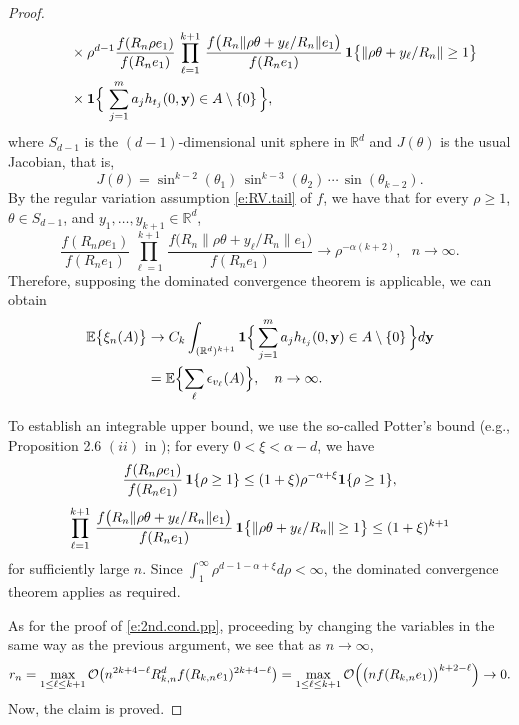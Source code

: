 \documentclass[11pt]{amsart}
\numberwithin{equation}{section}
\theoremstyle{plain}
\theoremstyle{definition}
\begin{document}
\begin{proof}
\begin{align}
&\qquad \times \rho^{d-1} \frac{f(R_n\rho e_1)}{f(R_ne_1)}\, \prod_{\ell = 1}^{k+1}\, \frac{f \bigl( R_n \| \rho \theta + y_\ell /R_n \|e_1 \bigr)}{f(R_ne_1)}\, {{\bf 1}} \bigl\{ \| \rho \theta + y_\ell /R_n \| \geq 1 \bigr\} \notag \\
&\qquad \times {{\bf 1}} \Bigl\{ \ \sum_{j=1}^m a_j h_{t_j}(0, {{\bf y}}) \in A \setminus \{ 0 \}\, \Bigr\}, \notag
\end{align}
where $S_{d-1}$ is the $(d-1)$-dimensional unit sphere in ${{\mathbb R}}^d$ and $J(\theta)$ is the usual Jacobian, that is,
$$
J(\theta)  =   \sin^{k-2}(\theta_1) \, \sin^{k-3}(\theta_2) \, \cdots\, \sin (\theta_{k-2}).
$$
By the regular variation assumption \eqref{e:RV.tail} of $f$, we have that for every $\rho \geq 1$, $\theta \in S_{d-1}$, and $y_1,\dots, y_{k+1} \in {{\mathbb R}}^d$,
$$
\frac{f(R_n\rho e_1)}{f(R_ne_1)}\, \prod_{\ell = 1}^{k+1}\, \frac{f \bigl( R_n \| \rho \theta + y_\ell /R_n \|e_1 \bigr)}{f(R_ne_1)} \to \rho^{-\alpha (k+2)}, \ \ \ n\to\infty.
$$
Therefore, supposing the dominated convergence theorem is applicable, we can obtain
\begin{align*}
{\mathbb{E}} \bigl\{ \xi_n(A) \bigr\} &\to C_k \int_{({{\mathbb R}}^d)^{k+1}} {{\bf 1}} \Bigl\{ \, \sum_{j=1}^m a_j h_{t_j}(0,{{\bf y}}) \in A \setminus \{ 0 \}\, \Bigr\}d{{\bf y}}
\\
&= {\mathbb{E}} \Bigl\{ \sum_\ell \epsilon_{v_\ell} (A) \Bigr\}, \ \ \ n\to\infty.
\end{align*}

To establish an integrable upper bound, we use the so-called Potter's bound (e.g., Proposition 2.6 $(ii)$ in \cite{resnick:2007}); for every $0 < \xi < \alpha-d$, we have 
\begin{equation}  \label{e:P-Potter1}
\frac{f(R_n\rho e_1)}{f(R_ne_1)}\, {{\bf 1}} \{  \rho \geq 1\} \leq (1+\xi) \rho^{-\alpha +\xi}  {{\bf 1}} \{  \rho \geq 1\},
\end{equation}
\begin{equation}  \label{e:P-Potter2}
\prod_{\ell = 1}^{k+1}\, \frac{f \bigl( R_n \| \rho \theta + y_\ell /R_n \|e_1 \bigr)}{f(R_ne_1)}\, {{\bf 1}} \bigl\{ \| \rho \theta + y_\ell /R_n \| \geq 1 \bigr\} \leq (1+\xi)^{k+1}
\end{equation}
for sufficiently large $n$. Since $\int_1^\infty \rho^{d-1-\alpha +\xi}d\rho < \infty$, the dominated convergence theorem applies as required.

As for the proof of \eqref{e:2nd.cond.pp}, proceeding by changing the variables in the same way as the previous argument, we see that as $n\to\infty$,
$$
r_n = \max_{1 \leq \ell \leq k+1} \mathcal O \bigl(n^{2k+4-\ell} R_{k,n}^d f(R_{k,n}e_1)^{2k+4-\ell} \bigr) = \max_{1 \leq \ell \leq k+1} \mathcal O \Bigl(\bigl(n  f(R_{k,n}e_1)\bigr)^{k+2-\ell} \Bigr) \to 0.
$$
Now, the claim is proved.


\end{proof}
\end{document}
